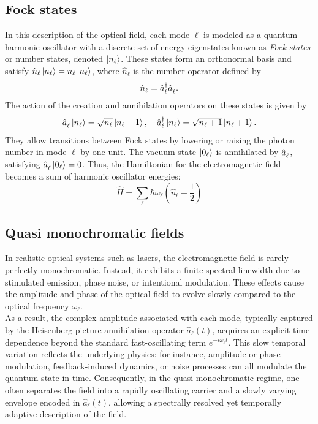 \subsection*{Fock states}
In this description of the optical field, each mode $\ell$ is modeled as a quantum harmonic oscillator with a discrete set of energy eigenstates known as \textit{Fock states} or number states, denoted $\ket{n_\ell}$. These states form an orthonormal basis and satisfy $\hat{n}_{\ell} \ket{n_\ell} = n_\ell \ket{n_\ell}$, where $\hat{n}_{\ell}$ is the number operator defined by
\[
\hat{n}_{\ell} = \hat{a}_{\ell}^\dagger \hat{a}^{\vphantom{\dagger}}_{\ell}.
\]
The action of the creation and annihilation operators on these states is given by
\[
\hat{a}^{\vphantom{\dagger}}_{\ell} \ket{n_\ell} = \sqrt{n_\ell} \ket{n_\ell - 1}, \quad
\hat{a}_{\ell}^\dagger \ket{n_\ell} = \sqrt{n_\ell + 1} \ket{n_\ell + 1}.
\]
They allow transitions between Fock states by lowering or raising the photon number in mode $\ell$ by one unit. The vacuum state $\ket{0_\ell}$ is annihilated by $\hat{a}^{\vphantom{\dagger}}_{\ell}$, satisfying $\hat{a}^{\vphantom{\dagger}}_{\ell} \ket{0_\ell} = 0$. Thus, the Hamiltonian for the electromagnetic field becomes a sum of harmonic oscillator energies:
\begin{equation}
\hat{H} = \sum_\ell \hbar \omega_{\ell} \left( \hat{n}_\ell + \frac{1}{2} \right)
\end{equation}
\subsection*{Quasi monochromatic fields } 
In realistic optical systems such as lasers, the electromagnetic field is rarely perfectly monochromatic. Instead, it exhibits a finite spectral linewidth due to stimulated emission, phase noise, or intentional modulation. These effects cause the amplitude and phase of the optical field to evolve slowly compared to the optical frequency $\omega_\ell$. \\

\noindent As a result, the complex amplitude associated with each mode, typically captured by the Heisenberg-picture annihilation operator $\hat{a}_\ell(t)$, acquires an explicit time dependence beyond the standard fast-oscillating term $e^{-i\omega_\ell t}$. This slow temporal variation reflects the underlying physics: for instance, amplitude or phase modulation, feedback-induced dynamics, or noise processes can all modulate the quantum state in time. Consequently, in the quasi-monochromatic regime, one often separates the field into a rapidly oscillating carrier and a slowly varying envelope encoded in $\hat{a}_\ell(t)$, allowing a spectrally resolved yet temporally adaptive description of the field. \\

